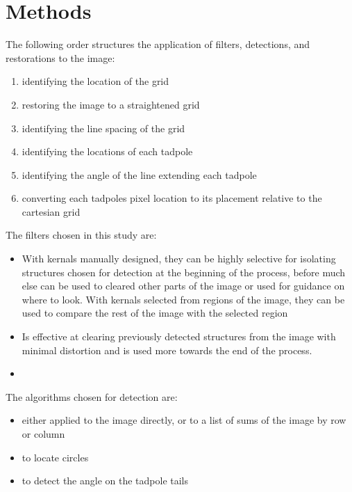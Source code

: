 \documentclass{article}
\begin{document}
\section{Methods}
The following order structures the application of filters, detections, and restorations to the image:
\begin{enumerate}
    \item identifying the location of the grid 
    \item restoring the image to a straightened grid
    \item identifying the line spacing of the grid
    \item identifying the locations of each tadpole
    \item identifying the angle of the line extending each tadpole
    \item converting each tadpoles pixel location to its placement relative to the cartesian grid
\end{enumerate}
    

    The filters chosen in this study are:
    \begin{itemize}
        \item[Convolutional Filters] 
        \subitem With kernals manually designed, they can be highly selective for isolating structures chosen for detection at the beginning of the process,
        before much else can be used to cleared other parts of the image or used for guidance on where to look.                                
        \subitem With kernals selected from regions of the image, they can be used to compare the rest of the image with the selected region
        \item[Morphological Erode] Is effective at clearing previously detected structures from the image with minimal distortion and is used more
        towards the end of the process.
        \item[Morphological Open]
    \end{itemize}

    The algorithms chosen for detection are:
    \begin{itemize}
        \item[Peak Detection] either applied to the image directly, or to a list of sums of the image by row or column
        \item[Hough Transform] to locate circles
        \item[Template Matching] to detect the angle on the tadpole tails 
    \end{itemize}
\end{document}
